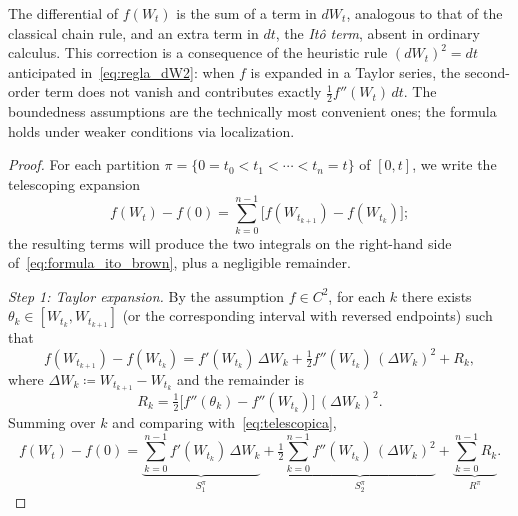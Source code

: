 \documentclass[11pt,a4paper,oneside]{report}
\theoremstyle{plain}
\theoremstyle{definition}
\theoremstyle{remark}
\newcommand{\1}{\mathbf{1}}
\newcommand{\eqdef}{\coloneqq}
\begin{document}
The differential of $f(W_t)$
is the sum of a term in $dW_t$, analogous to that of the classical
chain rule, and an extra term in $dt$, the \emph{Itô term}, absent in
ordinary calculus. This correction is a consequence of the heuristic
rule $(dW_t)^2 = dt$ anticipated in~\eqref{eq:regla_dW2}: when $f$ is
expanded in a Taylor series, the second-order term does not vanish
and contributes exactly $\tfrac{1}{2} f''(W_t)\, dt$. The boundedness
assumptions are the technically most convenient ones; the formula
holds under weaker conditions via localization.

\begin{proof}
For each partition $\pi = \{0 = t_0 < t_1 < \cdots < t_n = t\}$ of
$[0, t]$, we write the telescoping expansion
\begin{equation}\label{eq:telescopica}
  f(W_t) - f(0)
  = \sum_{k=0}^{n-1} \bigl[f(W_{t_{k+1}}) - f(W_{t_k})\bigr];
\end{equation}
the resulting terms will produce the two integrals on the right-hand
side of~\eqref{eq:formula_ito_brown}, plus a negligible remainder.

\emph{Step 1: Taylor expansion.} By the assumption $f \in C^2$, for
each $k$ there exists $\theta_k \in [W_{t_k}, W_{t_{k+1}}]$ (or the
corresponding interval with reversed endpoints) such that
\begin{equation*}
  f(W_{t_{k+1}}) - f(W_{t_k})
  = f'(W_{t_k})\, \Delta W_k
   + \tfrac{1}{2} f''(W_{t_k})\, (\Delta W_k)^2
   + R_k,
\end{equation*}
where $\Delta W_k \eqdef W_{t_{k+1}} - W_{t_k}$ and the remainder is
\begin{equation*}
  R_k = \tfrac{1}{2}\bigl[f''(\theta_k) - f''(W_{t_k})\bigr]\,
        (\Delta W_k)^2.
\end{equation*}
Summing over $k$ and comparing with~\eqref{eq:telescopica},
\begin{equation}\label{eq:descomposicion_telescopica}
  f(W_t) - f(0)
  = \underbrace{\sum_{k=0}^{n-1} f'(W_{t_k})\, \Delta W_k}_{S_1^\pi}
   + \tfrac{1}{2} \underbrace{\sum_{k=0}^{n-1} f''(W_{t_k})\,
                              (\Delta W_k)^2}_{S_2^\pi}
   + \underbrace{\sum_{k=0}^{n-1} R_k}_{R^\pi}.
\end{equation}


\end{proof}
\end{document}
